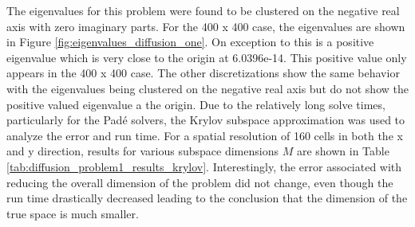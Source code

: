 The eigenvalues for this problem were found to be clustered on the negative real axis with zero imaginary parts. For the 400 x 400 case, the eigenvalues are shown in Figure \ref{fig:eigenvalues_diffusion_one}.  On exception to this is a positive eigenvalue which is very close to the origin at 6.0396e-14. This positive value only appears in the 400 x 400 case. The other discretizations show the same behavior with the eigenvalues being clustered on the negative real axis but do not show the positive valued eigenvalue a the origin. Due to the relatively long solve times, particularly for the Pad\'e solvers, the Krylov subspace approximation was used to analyze the error and run time. For a spatial resolution of 160 cells in both the x and y direction, results for various subspace dimensions $M$ are shown in Table \ref{tab:diffusion_problem1_results_krylov}. Interestingly, the error associated with reducing the overall dimension of the problem did not change, even though the run time drastically decreased leading to the conclusion that the dimension of the true space is much smaller. 


\FloatBarrier


